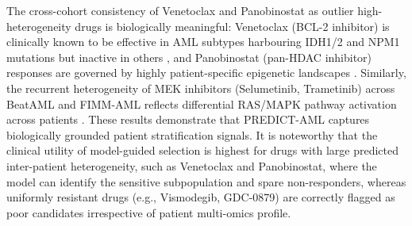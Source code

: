\documentclass[pdflatex,sn-mathphys-num]{sn-jnl}
\theoremstyle{thmstyleone}
\theoremstyle{thmstyletwo}
\theoremstyle{thmstylethree}
\begin{document}
The cross-cohort consistency of Venetoclax and Panobinostat as outlier high-heterogeneity drugs is biologically meaningful: Venetoclax (BCL-2 inhibitor) is clinically known to be effective in AML subtypes harbouring IDH1/2 and NPM1 mutations but inactive in others \cite{bisaillon2020genetic, diamantidis2025factors, zhang2020integrated}, and Panobinostat (pan-HDAC inhibitor) responses are governed by highly patient-specific epigenetic landscapes \cite{babu2021jak, tang2025epigenetic, kuhn2025epigenetic}. Similarly, the recurrent heterogeneity of MEK inhibitors (Selumetinib, Trametinib) across BeatAML and FIMM-AML reflects differential RAS/MAPK pathway activation across patients \cite{modak2024targeting, chen2025ras}. These results demonstrate that PREDICT-AML captures biologically grounded patient stratification signals. It is noteworthy that the clinical utility of model-guided selection is highest for drugs with large predicted inter-patient heterogeneity, such as Venetoclax and Panobinostat, where the model can identify the sensitive subpopulation and spare non-responders, whereas uniformly resistant drugs (e.g., Vismodegib, GDC-0879) are correctly flagged as poor candidates irrespective of patient multi-omics profile.


\end{document}
